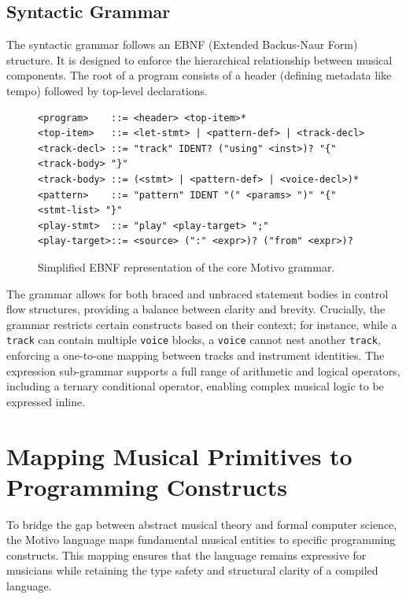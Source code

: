 \subsection{Syntactic Grammar}\label{detail-subsec:syntactic-grammar}

The syntactic grammar follows an EBNF (Extended Backus-Naur Form) structure.
It is designed to enforce the hierarchical relationship between musical components.
The root of a program consists of a header (defining metadata like tempo) followed by top-level declarations.

\begin{figure}[htbp]
  \centering
  \begin{lstlisting}[basicstyle=\ttfamily\scriptsize,breaklines=true]
<program>    ::= <header> <top-item>*
<top-item>   ::= <let-stmt> | <pattern-def> | <track-decl>
<track-decl> ::= "track" IDENT? ("using" <inst>)? "{" <track-body> "}"
<track-body> ::= (<stmt> | <pattern-def> | <voice-decl>)*
<pattern>    ::= "pattern" IDENT "(" <params> ")" "{" <stmt-list> "}"
<play-stmt>  ::= "play" <play-target> ";"
<play-target>::= <source> (":" <expr>)? ("from" <expr>)?
  \end{lstlisting}
  \caption{Simplified EBNF representation of the core Motivo grammar.}\label{detail-fig:figure}
\end{figure}

The grammar allows for both braced and unbraced statement bodies in control flow structures, providing a balance between
clarity and brevity.
Crucially, the grammar restricts certain constructs based on their context; for instance, while a \texttt{track} can
contain multiple \texttt{voice} blocks, a \texttt{voice} cannot nest another \texttt{track}, enforcing a one-to-one
mapping between tracks and instrument identities.
The expression sub-grammar supports a full range of arithmetic and logical operators, including a ternary conditional
operator, enabling complex musical logic to be expressed inline.


\section{Mapping Musical Primitives to Programming Constructs}\label{detail-sec:musical-mapping}

To bridge the gap between abstract musical theory and formal computer science, the Motivo language maps
fundamental musical
entities to specific programming constructs.
This mapping ensures that the language remains expressive for musicians while retaining the type safety and structural
clarity of a compiled language.

